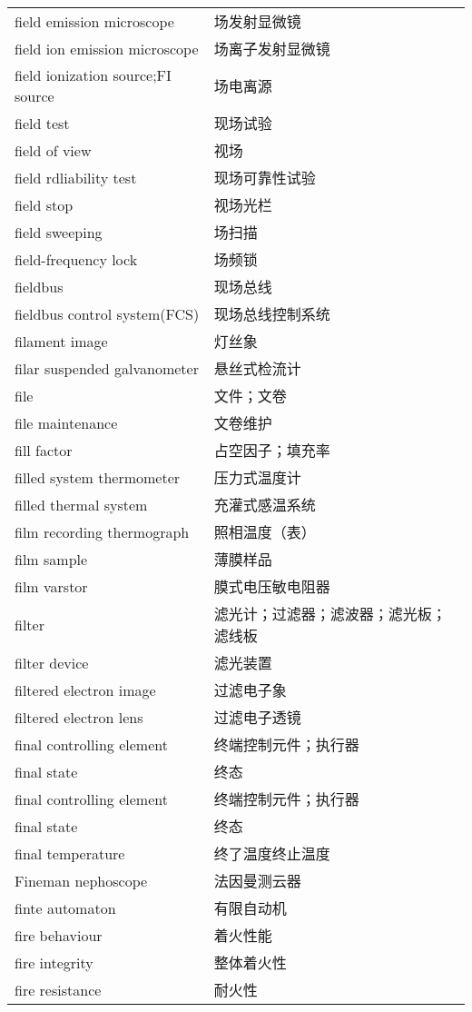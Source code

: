 \documentclass[
]{article}
\begin{document}
\begin{longtable}[]{@{}ll@{}}
field emission microscope & 场发射显微镜 \\
field ion emission microscope & 场离子发射显微镜 \\
field ionization source;FI source & 场电离源 \\
field test & 现场试验 \\
field of view & 视场 \\
field rdliability test & 现场可靠性试验 \\
field stop & 视场光栏 \\
field sweeping & 场扫描 \\
field-frequency lock & 场频锁 \\
fieldbus & 现场总线 \\
fieldbus control system(FCS) & 现场总线控制系统 \\
filament image & 灯丝象 \\
filar suspended galvanometer & 悬丝式检流计 \\
file & 文件；文卷 \\
file maintenance & 文卷维护 \\
fill factor & 占空因子；填充率 \\
filled system thermometer & 压力式温度计 \\
filled thermal system & 充灌式感温系统 \\
film recording thermograph & 照相温度（表） \\
film sample & 薄膜样品 \\
film varstor & 膜式电压敏电阻器 \\
filter & 滤光计；过滤器；滤波器；滤光板；滤线板 \\
filter device & 滤光装置 \\
filtered electron image & 过滤电子象 \\
filtered electron lens & 过滤电子透镜 \\
final controlling element & 终端控制元件；执行器 \\
final state & 终态 \\
final controlling element & 终端控制元件；执行器 \\
final state & 终态 \\
final temperature & 终了温度终止温度 \\
Fineman nephoscope & 法因曼测云器 \\
finte automaton & 有限自动机 \\
fire behaviour & 着火性能 \\
fire integrity & 整体着火性 \\
fire resistance & 耐火性 \\

\end{longtable}
\end{document}
